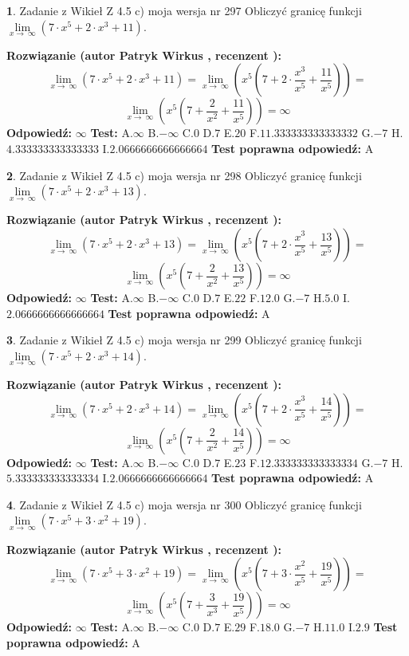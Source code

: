 \documentclass[12pt, a4paper]{article}
\theoremstyle{definition} %
\newtheorem{zad}{}
\newcommand{\zadStart}[1]{\begin{zad}#1\newline}
\newcommand{\zadStop}{\end{zad}}
\newcommand{\rozwStart}[2]{\noindent \textbf{Rozwiązanie (autor #1 , recenzent #2): }\newline}
\newcommand{\rozwStop}{\newline}
\newcommand{\odpStart}{\noindent \textbf{Odpowiedź:}\newline}
\newcommand{\odpStop}{\newline}
\newcommand{\testStart}{\noindent \textbf{Test:}\newline}
\newcommand{\testStop}{\newline}
\newcommand{\kluczStart}{\noindent \textbf{Test poprawna odpowiedź:}\newline}
\newcommand{\kluczStop}{\newline}
\begin{document}
\zadStart{Zadanie z Wikieł Z 4.5 c) moja wersja nr 297}
Obliczyć granicę funkcji  $\lim\limits_{x\to\ \infty}(7 \cdot x^{5}+2 \cdot x^{3}+11)$.
\zadStop
\rozwStart{Patryk Wirkus}{}
$$\lim\limits_{x\to\ \infty}(7 \cdot x^{5}+2 \cdot x^{3}+11) = \lim\limits_{x\to\ \infty}(x^{5}(7 +2 \cdot \frac{x^{3}}{x^{5}}+\frac{11}{x^{5}})) =$$ $$\lim\limits_{x\to\ \infty}(x^{5}(7 +\frac{2}{x^{2}}+\frac{11}{x^{5}})) =\infty$$
\rozwStop
\odpStart
$\infty$
\odpStop
\testStart
A.$\infty$ B.$-\infty$ C.$0$ D.$7$ E.$20$
F.$11.333333333333332$ G.$-7$
H.$4.333333333333333$
I.$2.0666666666666664$
\testStop
\kluczStart
A
\kluczStop



\zadStart{Zadanie z Wikieł Z 4.5 c) moja wersja nr 298}
Obliczyć granicę funkcji  $\lim\limits_{x\to\ \infty}(7 \cdot x^{5}+2 \cdot x^{3}+13)$.
\zadStop
\rozwStart{Patryk Wirkus}{}
$$\lim\limits_{x\to\ \infty}(7 \cdot x^{5}+2 \cdot x^{3}+13) = \lim\limits_{x\to\ \infty}(x^{5}(7 +2 \cdot \frac{x^{3}}{x^{5}}+\frac{13}{x^{5}})) =$$ $$\lim\limits_{x\to\ \infty}(x^{5}(7 +\frac{2}{x^{2}}+\frac{13}{x^{5}})) =\infty$$
\rozwStop
\odpStart
$\infty$
\odpStop
\testStart
A.$\infty$ B.$-\infty$ C.$0$ D.$7$ E.$22$
F.$12.0$ G.$-7$
H.$5.0$
I.$2.0666666666666664$
\testStop
\kluczStart
A
\kluczStop



\zadStart{Zadanie z Wikieł Z 4.5 c) moja wersja nr 299}
Obliczyć granicę funkcji  $\lim\limits_{x\to\ \infty}(7 \cdot x^{5}+2 \cdot x^{3}+14)$.
\zadStop
\rozwStart{Patryk Wirkus}{}
$$\lim\limits_{x\to\ \infty}(7 \cdot x^{5}+2 \cdot x^{3}+14) = \lim\limits_{x\to\ \infty}(x^{5}(7 +2 \cdot \frac{x^{3}}{x^{5}}+\frac{14}{x^{5}})) =$$ $$\lim\limits_{x\to\ \infty}(x^{5}(7 +\frac{2}{x^{2}}+\frac{14}{x^{5}})) =\infty$$
\rozwStop
\odpStart
$\infty$
\odpStop
\testStart
A.$\infty$ B.$-\infty$ C.$0$ D.$7$ E.$23$
F.$12.333333333333334$ G.$-7$
H.$5.333333333333334$
I.$2.0666666666666664$
\testStop
\kluczStart
A
\kluczStop



\zadStart{Zadanie z Wikieł Z 4.5 c) moja wersja nr 300}
Obliczyć granicę funkcji  $\lim\limits_{x\to\ \infty}(7 \cdot x^{5}+3 \cdot x^{2}+19)$.
\zadStop
\rozwStart{Patryk Wirkus}{}
$$\lim\limits_{x\to\ \infty}(7 \cdot x^{5}+3 \cdot x^{2}+19) = \lim\limits_{x\to\ \infty}(x^{5}(7 +3 \cdot \frac{x^{2}}{x^{5}}+\frac{19}{x^{5}})) =$$ $$\lim\limits_{x\to\ \infty}(x^{5}(7 +\frac{3}{x^{3}}+\frac{19}{x^{5}})) =\infty$$
\rozwStop
\odpStart
$\infty$
\odpStop
\testStart
A.$\infty$ B.$-\infty$ C.$0$ D.$7$ E.$29$
F.$18.0$ G.$-7$
H.$11.0$
I.$2.9$
\testStop
\kluczStart
A
\kluczStop
\end{document}
